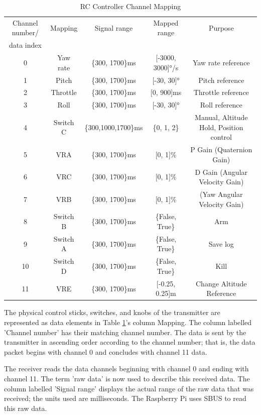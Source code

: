 \documentclass{report}
\begin{document}
\begin{table}[h]
  \centering
  \begin{tabular}{|c|c|c|c|c|}
    \hline
    Channel number/ & Mapping & Signal range & Mapped range & Purpose \\
    data index & & & & \\
    \hline
    0 & Yaw rate & \{300, 1700\}ms & [-3000, 3000]°/s & Yaw rate reference \\
    1 & Pitch & \{300, 1700\}ms & [-30, 30]° & Pitch reference \\
    2 & Throttle & \{300, 1700\}ms & [0, 900]ms & Throttle reference \\
    3 & Roll & \{300, 1700\}ms & [-30, 30]° & Roll reference \\
    4 & Switch C & \{300,1000,1700\}ms & \{0, 1, 2\} & Manual, Altitude Hold,
    Position control \\
    5 & VRA & \{300, 1700\}ms & [0, 1]\% & P Gain (Quaternion Gain) \\
    6 & VRC & \{300, 1700\}ms & [0, 1]\% & D Gain (Angular Velocity Gain) \\
    7 & VRB & \{300, 1700\}ms & [0, 1]\% & (Yaw Angular Velocity Gain)\\
    8 & Switch B & \{300, 1700\}ms & \{False, True\} & Arm \\
    9 & Switch A & \{300, 1700\}ms & \{False, True\} & Save log \\
    10 & Switch D & \{300, 1700\}ms & \{False, True\} & Kill \\
    11 & VRE & \{300, 1700\}ms & [-0.25, 0.25]m & Change Altitude Reference\\
    \hline
  \end{tabular}
  \caption{RC Controller Channel Mapping}
  \label{Figure:RC_Controller_Channel_Mapping}
\end{table}

The physical control sticks, switches, and knobs of the transmitter are
represented as data elements in Table
\ref{Figure:RC_Controller_Channel_Mapping}'s column Mapping. The column labelled
'Channel number' has their matching channel number. The data is sent by the
transmitter in ascending order according to the channel number; that is, the
data packet begins with channel 0 and concludes with channel 11 data.

The receiver reads the data channels beginning with channel 0 and ending with
channel 11. The term 'raw data' is now used to describe this received data. The
column labelled 'Signal range' displays the actual range of the raw data that
was received; the units used are milliseconds. The Raspberry Pi uses SBUS to
read this raw data.
\end{document}
